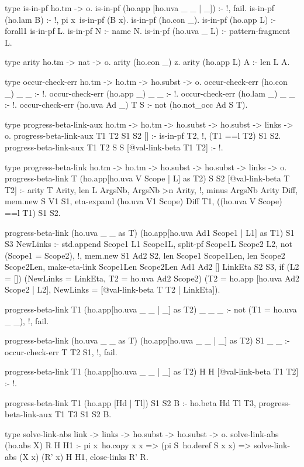 \begin{elpicode}
\begin{elpicode}
  type is-in-pf ho.tm -> o.
  is-in-pf (ho.app [ho.uva _ _ | _]) :- !, fail.
  is-in-pf (ho.lam B) :- !, pi x\ is-in-pf (B x).
  is-in-pf (ho.con _).
  is-in-pf (ho.app L) :- forall1 is-in-pf L.
  is-in-pf N :- name N.
  is-in-pf (ho.uva _ L) :- pattern-fragment L.

  type arity ho.tm -> nat -> o.
  arity (ho.con _) z.
  arity (ho.app L) A :- len L A.

  type occur-check-err ho.tm -> ho.tm -> ho.subst -> o.
  occur-check-err (ho.con _) _ _ :- !.
  occur-check-err (ho.app _) _ _ :- !.
  occur-check-err (ho.lam _) _ _ :- !.
  occur-check-err (ho.uva Ad _) T S :-
    not (ho.not_occ Ad S T).

  type progress-beta-link-aux ho.tm -> ho.tm -> 
          ho.subst -> ho.subst -> links -> o.
  progress-beta-link-aux T1 T2 S1 S2 [] :-  is-in-pf T2, !,
    (T1 ==l T2) S1 S2.
  progress-beta-link-aux T1 T2 S S [@val-link-beta T1 T2] :- !.

  type progress-beta-link ho.tm -> ho.tm -> ho.subst -> 
        ho.subst -> links -> o.
  progress-beta-link T (ho.app[ho.uva V Scope | L] as T2) S S2 [@val-link-beta T T2] :- 
    arity T Arity, len L ArgsNb, ArgsNb >n Arity, !,
    minus ArgsNb Arity Diff, mem.new S V1 S1,
    eta-expand (ho.uva V1 Scope) Diff T1,
    ((ho.uva V Scope) ==l T1) S1 S2.

  progress-beta-link (ho.uva _ _ as T) (ho.app[ho.uva Ad1 Scope1 | L1] as T1) S1 S3 NewLinks :-
    std.append Scope1 L1 Scope1L,
    split-pf Scope1L Scope2 L2,
    not (Scope1 = Scope2), !,
    mem.new S1 Ad2 S2,
    len Scope1 Scope1Len,
    len Scope2 Scope2Len,
    make-eta-link Scope1Len Scope2Len Ad1 Ad2 [] LinkEta S2 S3,
    if (L2 = []) (NewLinks = LinkEta, T2 = ho.uva Ad2 Scope2) 
      (T2 = ho.app [ho.uva Ad2 Scope2 | L2], 
      NewLinks = [@val-link-beta T T2 | LinkEta]).

  progress-beta-link T1 (ho.app[ho.uva _ _ | _] as T2) _ _ _ :- 
    not (T1 = ho.uva _ _), !, fail.

  progress-beta-link (ho.uva _ _ as T) (ho.app[ho.uva _ _ | _] as T2) S1 _ _ :- 
    occur-check-err T T2 S1, !, fail.

  progress-beta-link T1 (ho.app[ho.uva _ _ | _] as T2) H H [@val-link-beta T1 T2] :- !.

  progress-beta-link T1 (ho.app [Hd | Tl]) S1 S2 B :-
    ho.beta Hd Tl T3, 
    progress-beta-link-aux T1 T3 S1 S2 B.

  type solve-link-abs link -> links -> ho.subst -> ho.subst -> o.
  solve-link-abs (ho.abs X) R H H1 :- 
    pi x\ ho.copy x x => (pi S\ ho.deref S x x) => 
      solve-link-abs (X x) (R' x) H H1,
    close-links R' R.


\end{elpicode}
\end{elpicode}
